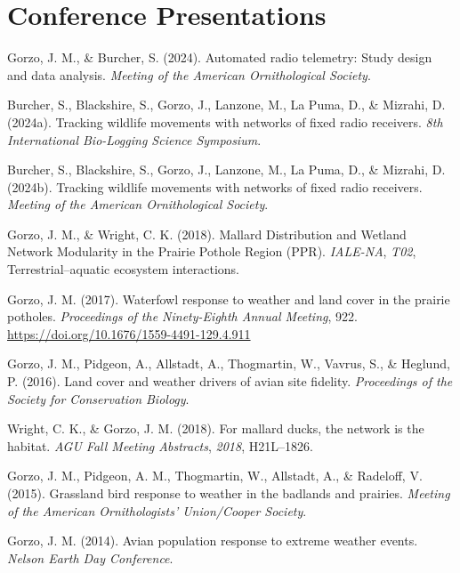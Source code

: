 \documentclass[11pt,a4paper,]{awesome-cv}
\newlength{\cslhangindent}
\newenvironment{CSLReferences}[2] %
 {\begin{list}{}{%
  \setlength{\itemindent}{0pt}
  \setlength{\leftmargin}{0pt}
  \setlength{\parsep}{0pt}
  \ifodd #1
   \setlength{\leftmargin}{\cslhangindent}
   \setlength{\itemindent}{-1\cslhangindent}
  \fi
  \setlength{\itemsep}{#2\baselineskip}}}
 {\end{list}}
\begin{document}
\section{Conference Presentations}\label{conference-presentations}

\label{refs-d1267b26d664c19ef27cb37d646a1e84}
\begin{CSLReferences}{1}{0}
Gorzo, J. M., \& Burcher, S. (2024). Automated radio telemetry: Study
design and data analysis. \emph{Meeting of the American Ornithological
Society}.

Burcher, S., Blackshire, S., Gorzo, J., Lanzone, M., La Puma, D., \&
Mizrahi, D. (2024a). Tracking wildlife movements with networks of fixed
radio receivers. \emph{8th International Bio-Logging Science Symposium}.

Burcher, S., Blackshire, S., Gorzo, J., Lanzone, M., La Puma, D., \&
Mizrahi, D. (2024b). Tracking wildlife movements with networks of fixed
radio receivers. \emph{Meeting of the American Ornithological Society}.

Gorzo, J. M., \& Wright, C. K. (2018). Mallard Distribution and Wetland
Network Modularity in the Prairie Pothole Region (PPR). \emph{IALE-NA},
\emph{T02}, Terrestrial--aquatic ecosystem interactions.

Gorzo, J. M. (2017). Waterfowl response to weather and land cover in the
prairie potholes. \emph{Proceedings of the Ninety-Eighth Annual
Meeting}, 922. \url{https://doi.org/10.1676/1559-4491-129.4.911}

Gorzo, J. M., Pidgeon, A., Allstadt, A., Thogmartin, W., Vavrus, S., \&
Heglund, P. (2016). Land cover and weather drivers of avian site
fidelity. \emph{Proceedings of the Society for Conservation Biology}.

Wright, C. K., \& Gorzo, J. M. (2018). For mallard ducks, the network is
the habitat. \emph{AGU Fall Meeting Abstracts}, \emph{2018}, H21L--1826.

Gorzo, J. M., Pidgeon, A. M., Thogmartin, W., Allstadt, A., \& Radeloff,
V. (2015). Grassland bird response to weather in the badlands and
prairies. \emph{Meeting of the American Ornithologists' Union/Cooper
Society}.

Gorzo, J. M. (2014). Avian population response to extreme weather
events. \emph{Nelson Earth Day Conference}.


\end{CSLReferences}
\end{document}

